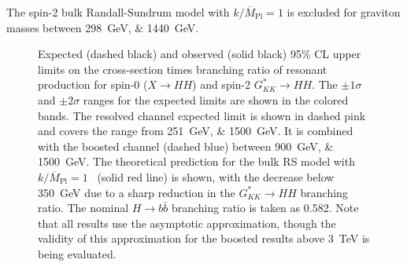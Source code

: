 The spin-2 bulk Randall-Sundrum model with $k/\overline{M}_{\mathrm{Pl}} = 1$ is excluded for 
graviton masses between \SIlist{298;1440}{\GeV}.
\begin{figure}[ht]
  \centering
  \vspace*{-3cm}

  \caption{\label{fig:res-limits}
    Expected (dashed black) and observed (solid black) 95\% CL upper limits on the cross-section times branching ratio of resonant production for spin-0 (\(X \rightarrow HH\)) and spin-2 \(G_{KK}^{*} \rightarrow HH\). 
    The \(\pm 1\sigma\) and \(\pm 2\sigma\) ranges for the expected limits are shown in the colored bands. 
    The resolved channel expected limit is shown in dashed pink and covers the range from \SIlist{251;1500}{\GeV}. 
    It is combined with the boosted channel (dashed blue) between \SIlist{900;1500}{\GeV}.
    The theoretical prediction for the bulk RS model with \(k/\overline{M}_{\mathrm{Pl}} = 1\)~\cite{Carvalho} 
    (solid red line) is shown, with the decrease below \SI{350}{\GeV} due to a sharp reduction in the \(G_{KK}^{*} \rightarrow HH\) branching ratio. The nominal \(H \rightarrow b\bar{b}\) branching ratio is taken as 0.582. Note 
    that all results use the asymptotic approximation, though the validity of this approximation for the boosted results 
    above \SI{3}{\TeV} is being evaluated.}
\end{figure}

